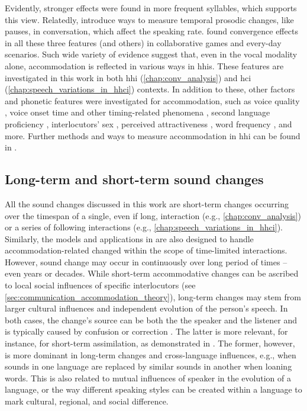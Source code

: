 Evidently, stronger effects were found in more frequent syllables, which supports this view.
Relatedly, \citet{Edlund2009pause, Xiao2015analyzing, Cohen2017converging} introduce ways to measure temporal prosodic changes, like pauses, in conversation, which affect the speaking rate.
\citet{Levitan2011measuring, Local2007phonetic} found convergence effects in all these three features (and others) in collaborative games and every-day scenarios.
Such wide variety of evidence suggest that, even in the vocal modality alone, accommodation is reflected in various ways in \acp{hhi}.
These features are investigated in this work in both \ac{hhi} (\cref{chap:conv_analysis}) and \ac{hci} (\cref{chap:speech_variations_in_hhci}) contexts.
In addition to these, other factors and phonetic features were investigated for accommodation, such as voice quality \citep{Borrie2017conversational}, voice onset time \citep{Nielsen2011specificity} and other timing-related phenomena \citep{Putman1984conception}, second language proficiency \citep{Law2020convergence}, interlocutors' sex \citep{Levitan2012acoustic, Bailly2014assessing}, perceived attractiveness \citep{Michalsky2017pitch}, word frequency \citep{Nenkova2008high}, and more.
Further methods and ways to measure accommodation in \ac{hhi} can be found in \citet{Lewandowski2019phonetic, DeLooze2014investigating}.

\subsection{Long-term and short-term sound changes}
\label{subsec:sound_change}

All the sound changes discussed in this work are short-term changes occurring over the timespan of a single, even if long, interaction (e.g., \cref{chap:conv_analysis}) or a series of following interactions (e.g., \cref{chap:speech_variations_in_hhci}).
Similarly, the models and applications in  are also designed to handle accommodation-related changed within the scope of time-limited interactions.
However, sound change may occur in continuously over long period of times -- even years or decades.
While short-term accommodative changes can be ascribed to local social influences of specific interlocutors (see \cref{sec:communication_accommodation_theory}), long-term changes may stem from larger cultural influences and independent evolution of the person's speech.
In both cases, the change's source can be both the the speaker and the listener \citep[][pp.\ 176-187]{Ohala1989sound} and is typically caused by confusion or correction \citep{Ohala1993phonetics}.
The latter is more relevant, for instance, for short-term assimilation, as demonstrated in \citet{Ohala1990phonetics}.
The former, however, is more dominant in long-term changes and cross-language influences, e.g., when sounds in one language are replaced by similar sounds in another when loaning words.
This is also related to mutual influences of speaker in the evolution of a language, or the way different speaking styles can be created within a language to mark cultural, regional, and social difference.

